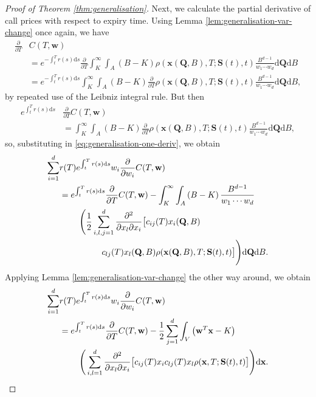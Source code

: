 \documentclass[english]{article}
\numberwithin{equation}{section}
\numberwithin{figure}{section}
\theoremstyle{bolddescit}
\theoremstyle{definition}
\theoremstyle{definition}
\theoremstyle{plain}
\theoremstyle{plain}
\theoremstyle{bolddesc}
\theoremstyle{plain}
\theoremstyle{remark}
\begin{document}
\begin{proof}[Proof of Theorem \ref{thm:generalisation}]
  Next, we calculate the partial derivative of call prices with respect to expiry time. Using Lemma \ref{lem:generalisation-var-change} once again, we have
  \begin{align*}
    \frac{\partial}{\partial T} &C(T,\mathbf{w})\\
    &= e^{-\int_t^T r(s) \mathrm{d}s} \frac{\partial}{\partial T}\int_K^\infty \int_A \left(B - K\right) \rho(\mathbf{x}(\mathbf{Q},B),T;\mathbf{S}(t),t) \frac{B^{d-1}}{w_1 \cdots w_d} \mathrm{d}\mathbf{Q} \mathrm{d}B\\
    &= e^{-\int_t^T r(s) \mathrm{d}s} \int_K^\infty \int_A \left(B - K\right) \frac{\partial}{\partial T}\rho(\mathbf{x}(\mathbf{Q},B),T;\mathbf{S}(t),t) \frac{B^{d-1}}{w_1 \cdots w_d} \mathrm{d}\mathbf{Q} \mathrm{d}B,
  \end{align*}
  by repeated use of the Leibniz integral rule. But then
  \begin{align*}
    e^{\int_t^T r(s) \mathrm{d}s} &\frac{\partial}{\partial T} C(T,\mathbf{w})\\
    &= \int_K^\infty \int_A \left(B - K\right) \frac{\partial}{\partial T}\rho(\mathbf{x}(\mathbf{Q},B),T;\mathbf{S}(t),t) \frac{B^{d-1}}{w_1 \cdots w_d} \mathrm{d}\mathbf{Q} \mathrm{d}B,
  \end{align*}
  so, substituting in \eqref{eq:generalisation-one-deriv}, we obtain
  \begin{align*}
    \sum_{i=1}^{d} &r(T) e^{\int_t^T r(s) \mathrm{d}s} w_i \frac{\partial}{\partial w_i} C(T,\mathbf{w})\notag\\
    &= e^{\int_t^T r(s) \mathrm{d}s} \frac{\partial}{\partial T} C(T,\mathbf{w}) - \int_K^\infty \int_A \left(B - K\right) \frac{B^{d-1}}{w_1 \cdots w_d}\notag\\
      &\ \ \ \ \ \ \ \Bigg( \frac{1}{2} \sum_{i,l,j=1}^{d} \frac{\partial^2}{\partial x_l \partial x_i}\big[c_{ij}(T) x_i(\mathbf{Q},B) \notag\\
      &\ \ \ \ \ \ \ \ \ \ \ \ \ \ \ c_{lj}(T) x_l(\mathbf{Q},B) \rho(\mathbf{x}(\mathbf{Q},B),T;\mathbf{S}(t),t)\big] \Bigg) \mathrm{d}\mathbf{Q} \mathrm{d}B.
  \end{align*}
  Applying Lemma \ref{lem:generalisation-var-change} the other way around, we obtain
  \begin{align}
    \sum_{i=1}^{d} &r(T) e^{\int_t^T r(s) \mathrm{d}s} w_i \frac{\partial}{\partial w_i} C(T,\mathbf{w})\notag\\
    &= e^{\int_t^T r(s) \mathrm{d}s} \frac{\partial}{\partial T} C(T,\mathbf{w}) - \frac{1}{2} \sum_{j=1}^{d} \int_V \left(\mathbf{w}^T \mathbf{x} - K\right) \notag\\
      &\ \ \ \ \ \ \ \Bigg( \sum_{i,l=1}^{d} \frac{\partial^2}{\partial x_l \partial x_i}\big[c_{ij}(T) x_i c_{lj}(T) x_l \rho(\mathbf{x},T;\mathbf{S}(t),t)\big] \Bigg) \mathrm{d}\mathbf{x}. \label{eq:generalisation-two-derivs}
  \end{align}


\end{proof}
\end{document}
